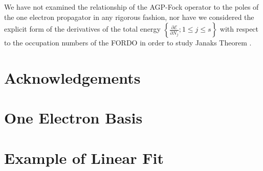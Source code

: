 \documentclass[aps,preprint]{revtex4}%
\begin{document}
We have not examined the relationship of the AGP-Fock operator to the poles of
the one electron propagator in any rigorous fashion, nor have we considered
the explicit form of the derivatives of the total energy $\left\{
\frac{\partial\mathcal{E}}{\partial N_{j}};1\leq j\leq s\right\}  $ with
respect to the occupation numbers of the FORDO in order to study Janaks
Theorem \cite{Janak}.

\section{Acknowledgements}

\appendix

\section{One Electron Basis\label{basis}}

\section{Example of Linear Fit\label{LinfitEX}}
\end{document}

